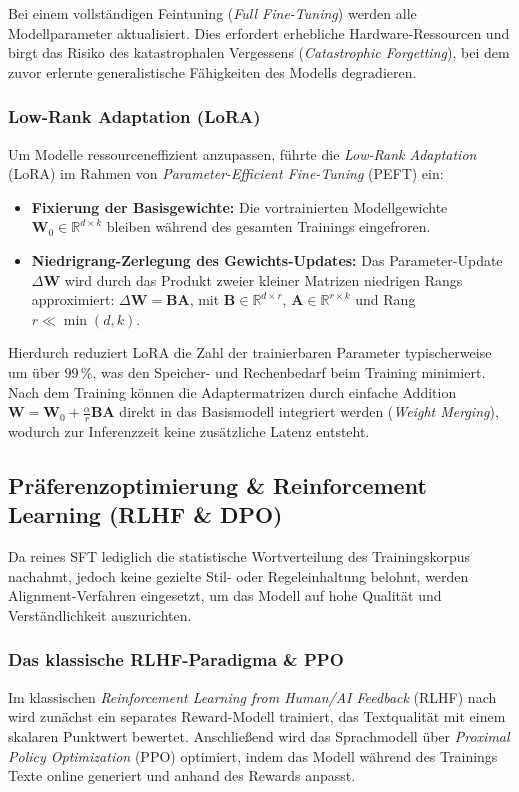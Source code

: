 Bei einem vollständigen Feintuning (\textit{Full Fine-Tuning}) werden alle Modellparameter aktualisiert. Dies erfordert erhebliche Hardware-Ressourcen und birgt das Risiko des katastrophalen Vergessens (\textit{Catastrophic Forgetting}), bei dem zuvor erlernte generalistische Fähigkeiten des Modells degradieren.

\subsubsection{Low-Rank Adaptation (LoRA)}
Um Modelle ressourceneffizient anzupassen, führte \citet{hu2022lora} die \textit{Low-Rank Adaptation} (LoRA) im Rahmen von \textit{Parameter-Efficient Fine-Tuning} (PEFT) ein:
\begin{itemize}
    \item \textbf{Fixierung der Basisgewichte:} Die vortrainierten Modellgewichte $\mathbf{W}_0 \in \mathbb{R}^{d \times k}$ bleiben während des gesamten Trainings eingefroren.
    \item \textbf{Niedrigrang-Zerlegung des Gewichts-Updates:} Das Parameter-Update $\Delta \mathbf{W}$ wird durch das Produkt zweier kleiner Matrizen niedrigen Rangs approximiert: $\Delta \mathbf{W} = \mathbf{B} \mathbf{A}$, mit $\mathbf{B} \in \mathbb{R}^{d \times r}$, $\mathbf{A} \in \mathbb{R}^{r \times k}$ und Rang $r \ll \min(d, k)$.
\end{itemize}
Hierdurch reduziert LoRA die Zahl der trainierbaren Parameter typischerweise um über $99\,\%$, was den Speicher- und Rechenbedarf beim Training minimiert. Nach dem Training können die Adaptermatrizen durch einfache Addition $\mathbf{W} = \mathbf{W}_0 + \frac{\alpha}{r}\mathbf{B}\mathbf{A}$ direkt in das Basismodell integriert werden (\textit{Weight Merging}), wodurch zur Inferenzzeit keine zusätzliche Latenz entsteht.

\subsection{Präferenzoptimierung \& Reinforcement Learning (RLHF \& DPO)}
\label{sec:rlhf_dpo_ppo_theorie}

Da reines SFT lediglich die statistische Wortverteilung des Trainingskorpus nachahmt, jedoch keine gezielte Stil- oder Regeleinhaltung belohnt, werden Alignment-Verfahren eingesetzt, um das Modell auf hohe Qualität und Verständlichkeit auszurichten.

\subsubsection{Das klassische RLHF-Paradigma \& PPO}
Im klassischen \textit{Reinforcement Learning from Human/AI Feedback} (RLHF) nach \citet{ouyang2022training} wird zunächst ein separates Reward-Modell trainiert, das Textqualität mit einem skalaren Punktwert bewertet. Anschließend wird das Sprachmodell über \textit{Proximal Policy Optimization} (PPO) \citep{schulman2017proximal} optimiert, indem das Modell während des Trainings Texte online generiert und anhand des Rewards anpasst.

